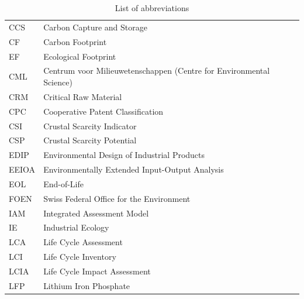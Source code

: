 \documentclass[a4paper,fleqn]{cas-dc}
\begin{document}
	\begin{table}[!htbp]
		\centering
		\caption{List of abbreviations}\label{tab:abbreviations}
		\begin{tabular}{ll}
			\toprule
			CCS	              & Carbon Capture and Storage                                          \\
			CF                & Carbon Footprint                                                    \\
			EF                & Ecological Footprint                                                \\
			CML               & Centrum voor Milieuwetenschappen (Centre for Environmental Science) \\
			CRM               & Critical Raw Material                                               \\
			CPC               & Cooperative Patent Classification                                   \\
			CSI               & Crustal Scarcity Indicator                                          \\
			CSP               & Crustal Scarcity Potential                                          \\
			EDIP              & Environmental Design of Industrial Products                         \\
			EEIOA             & Environmentally Extended Input-Output Analysis                      \\
			EOL               & End-of-Life                                                         \\
			FOEN              & Swiss Federal Office for the Environment                            \\
			IAM               & Integrated Assessment Model                                         \\
			IE                & Industrial Ecology                                                  \\
			LCA               & Life Cycle Assessment                                               \\
			LCI               & Life Cycle Inventory                                                \\
			LCIA              & Life Cycle Impact Assessment                                        \\
			LFP               & Lithium Iron Phosphate                                              \\

\end{tabular}
\end{table}
\end{document}

